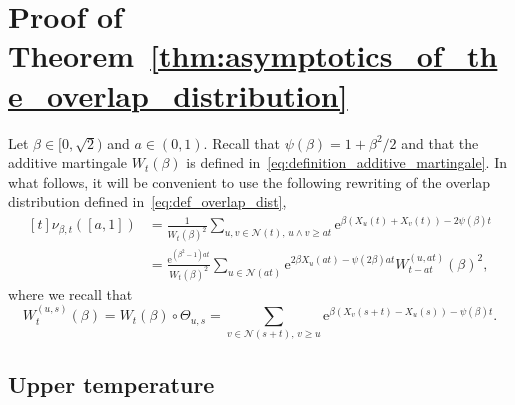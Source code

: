 \documentclass[10pt]{amsart}
\theoremstyle{definition}\newtheorem{defi}[theo]{Definition}\newtheorem{rema}[theo]{Remark}\newtheorem{exam}[theo]{Example}\newtheorem{exem}[theo]{Example}\newtheorem{nota}[theo]{Notation}
\newcommand{\e}{\mathrm{e}}
\newcommand\1{\mathds{1}}
\newcommand{\cN}{\mathcal{N}}
\begin{document}
\section{Proof of Theorem~\ref{thm:asymptotics_of_the_overlap_distribution}}\label{sec:typical}

Let $\beta \in [0, \sqrt{2})$ and $a \in (0, 1)$. Recall that $\psi(\beta) = 1 + \beta^2/2$ and that the additive martingale $W_t(\beta)$ is defined in~\eqref{eq:definition_additive_martingale}. In what follows, it will be convenient to use the following rewriting of the overlap distribution defined in~\eqref{eq:def_overlap_dist},
\begin{equation}\label{eq:overlap_rewriting}
\begin{aligned}[t]
\nu_{\beta, t}([a, 1]) &= \frac{1}{W_t(\beta)^2} \sum_{u, v \in \cN(t),\, u \wedge v \geq at} \e^{\beta(X_u(t) + X_v(t)) - 2 \psi(\beta) t} \\
&= \frac{\e^{(\beta^2 - 1) at}}{W_t(\beta)^2} \sum_{u \in \cN(at)} \e^{2\beta X_u(at) - \psi(2\beta)at} W_{t - at}^{(u, at)}(\beta)^2,
\end{aligned}
\end{equation}
where we recall that
\begin{equation}\label{eq:definition_shifted_martingale}
W_t^{(u, s)}(\beta) = W_t(\beta) \circ \Theta_{u, s} = \sum_{v \in \cN(s+t),\, v \geq u} \e^{\beta (X_v(s + t) - X_u(s)) - \psi(\beta)t}.
\end{equation}

\subsection{Upper temperature}\label{sct:first_regime}
\end{document}
